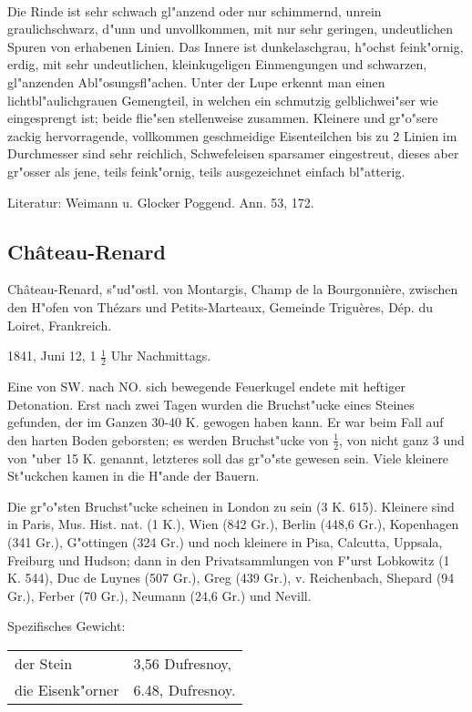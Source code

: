 \documentclass[a4paper, 11pt, oneside]{article}
\begin{document}
\paragraph{}
Die Rinde ist sehr schwach gl"anzend oder nur schimmernd, unrein graulichschwarz, d"unn und unvollkommen, mit nur sehr geringen, undeutlichen Spuren von erhabenen Linien. Das Innere ist dunkelaschgrau, h"ochst feink"ornig, erdig, mit sehr undeutlichen, kleinkugeligen Einmengungen und schwarzen, gl"anzenden Abl"osungsfl"achen. Unter der Lupe erkennt man einen lichtbl"aulichgrauen Gemengteil, in welchen ein schmutzig gelblichwei"ser wie eingesprengt ist; beide flie"sen stellenweise zusammen. Kleinere und gr"o"sere zackig hervorragende, vollkommen geschmeidige Eisenteilchen bis zu 2 Linien im Durchmesser sind sehr reichlich, Schwefeleisen sparsamer eingestreut, dieses aber gr"osser als jene, teils feink"ornig, teils ausgezeichnet einfach bl"atterig.

Literatur: Weimann u. Glocker Poggend. Ann. 53, 172.

\subsection{Château-Renard}

Château-Renard, s"ud"ostl. von Montargis, Champ de la Bourgonnière, zwischen den H"ofen von Thézars und Petits-Marteaux, Gemeinde Triguères, Dép. du Loiret, Frankreich.

1841, Juni 12, 1 $\frac{1}{2}$ Uhr Nachmittags.

Eine von SW. nach NO. sich bewegende Feuerkugel endete mit heftiger Detonation. Erst nach zwei Tagen wurden die Bruchst"ucke eines Steines gefunden, der im Ganzen 30-40 K. gewogen haben kann. Er war beim Fall auf den harten Boden geborsten; es werden Bruchst"ucke von $\frac{1}{2}$, von nicht ganz 3 und von "uber 15 K. genannt, letzteres soll das gr"o"ste gewesen sein. Viele kleinere St"uckchen kamen in die H"ande der Bauern.

Die gr"o"sten Bruchst"ucke scheinen in London zu sein (3 K. 615). Kleinere sind in Paris, Mus. Hist. nat. (1 K.), Wien (842 Gr.), Berlin (448,6 Gr.), Kopenhagen (341 Gr.), G"ottingen (324 Gr.) und noch kleinere in Pisa, Calcutta, Uppsala, Freiburg und Hudson; dann in den Privatsammlungen von F"urst Lobkowitz (1 K. 544), Duc de Luynes (507 Gr.), Greg (439 Gr.), v. Reichenbach, Shepard (94 Gr.), Ferber (70 Gr.), Neumann (24,6 Gr.) und Nevill.

Spezifisches Gewicht:  
\begin{table}[!ht]
    \centering
    \begin{tabular}{l l}
        der Stein & 3,56 Dufresnoy,\\
        die Eisenk"orner & 6.48, Dufresnoy.
    \end{tabular}
\end{table}
\end{document}

